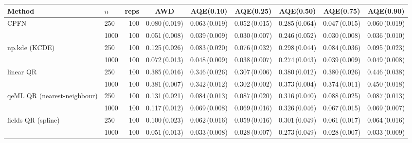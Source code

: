 \begin{tabular}{@{}llrcccccc@{}}
\toprule
Method & $n$ & reps & AWD & AQE(0.10) & AQE(0.25) & AQE(0.50) & AQE(0.75) & AQE(0.90) \\
\midrule
CPFN & 250 & 100 & 0.080\,{\scriptsize(0.019)} & 0.063\,{\scriptsize(0.019)} & 0.052\,{\scriptsize(0.015)} & 0.285\,{\scriptsize(0.064)} & 0.047\,{\scriptsize(0.015)} & 0.060\,{\scriptsize(0.019)} \\
 & 1000 & 100 & 0.051\,{\scriptsize(0.008)} & 0.039\,{\scriptsize(0.009)} & 0.030\,{\scriptsize(0.007)} & 0.246\,{\scriptsize(0.052)} & 0.030\,{\scriptsize(0.008)} & 0.036\,{\scriptsize(0.010)} \\
\midrule
np.kde (KCDE) & 250 & 100 & 0.125\,{\scriptsize(0.026)} & 0.083\,{\scriptsize(0.020)} & 0.076\,{\scriptsize(0.032)} & 0.298\,{\scriptsize(0.044)} & 0.084\,{\scriptsize(0.036)} & 0.095\,{\scriptsize(0.023)} \\
 & 1000 & 100 & 0.072\,{\scriptsize(0.013)} & 0.048\,{\scriptsize(0.009)} & 0.038\,{\scriptsize(0.007)} & 0.274\,{\scriptsize(0.043)} & 0.039\,{\scriptsize(0.009)} & 0.049\,{\scriptsize(0.008)} \\
\midrule
linear QR & 250 & 100 & 0.385\,{\scriptsize(0.016)} & 0.346\,{\scriptsize(0.026)} & 0.307\,{\scriptsize(0.006)} & 0.380\,{\scriptsize(0.012)} & 0.380\,{\scriptsize(0.026)} & 0.446\,{\scriptsize(0.038)} \\
 & 1000 & 100 & 0.381\,{\scriptsize(0.007)} & 0.342\,{\scriptsize(0.012)} & 0.302\,{\scriptsize(0.002)} & 0.373\,{\scriptsize(0.004)} & 0.374\,{\scriptsize(0.011)} & 0.450\,{\scriptsize(0.018)} \\
\midrule
qeML QR (nearest-neighbour) & 250 & 100 & 0.131\,{\scriptsize(0.021)} & 0.084\,{\scriptsize(0.013)} & 0.087\,{\scriptsize(0.020)} & 0.316\,{\scriptsize(0.040)} & 0.088\,{\scriptsize(0.025)} & 0.087\,{\scriptsize(0.013)} \\
 & 1000 & 100 & 0.117\,{\scriptsize(0.012)} & 0.069\,{\scriptsize(0.008)} & 0.069\,{\scriptsize(0.016)} & 0.326\,{\scriptsize(0.046)} & 0.067\,{\scriptsize(0.015)} & 0.069\,{\scriptsize(0.007)} \\
\midrule
fields QR (spline) & 250 & 100 & 0.100\,{\scriptsize(0.023)} & 0.062\,{\scriptsize(0.016)} & 0.059\,{\scriptsize(0.016)} & 0.301\,{\scriptsize(0.049)} & 0.061\,{\scriptsize(0.017)} & 0.064\,{\scriptsize(0.016)} \\
 & 1000 & 100 & 0.051\,{\scriptsize(0.013)} & 0.033\,{\scriptsize(0.008)} & 0.028\,{\scriptsize(0.007)} & 0.273\,{\scriptsize(0.049)} & 0.028\,{\scriptsize(0.007)} & 0.033\,{\scriptsize(0.009)} \\

\end{tabular}
